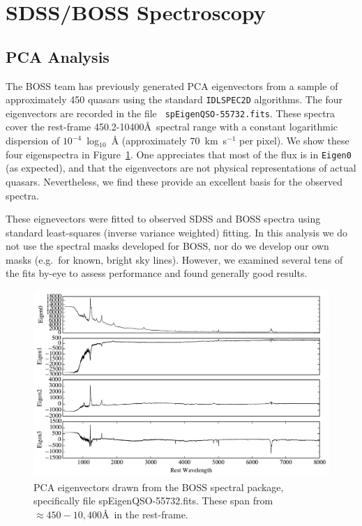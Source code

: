 \documentclass[11pt]{article}
\begin{document}
\section{SDSS/BOSS Spectroscopy}\label{sec:sdssboss}

\subsection{PCA Analysis}

The BOSS team has previously generated PCA eigenvectors from a sample
of approximately 450 quasars using the standard {\tt IDLSPEC2D}
algorithms.  The four eigenvectors are recorded in the file {\tt
  spEigenQSO-55732.fits}.  These spectra cover the rest-frame
450.2-10400\AA\ spectral range with a constant logarithmic dispersion
of $10^{-4}$~log$_{10}$~\AA{} (approximately $70$~km~s$^{-1}$ per
pixel).  We show these four eigenspectra in Figure~\ref{fig:eigen}.
One appreciates that most of the flux is in {\tt Eigen0} (as
expected), and that the eigenvectors are not physical representations
of actual quasars.  Nevertheless, we find these provide an excellent
basis for the observed spectra.

These eignevectors were fitted to observed SDSS and BOSS spectra using
standard least-squares (inverse variance weighted) fitting.  In this
analysis we do not use the spectral masks developed for BOSS, nor do
we develop our own masks (e.g.\ for known, bright sky lines).
However, we examined several tens of the fits by-eye to assess
performance and found generally good results.

\begin{figure}[h!]
  \vskip -0.1in
\begin{center}
  \includegraphics[width=5in]{figures/fig_boss_eigen.pdf}
\end{center}
 \vskip -0.20in
  \caption{\footnotesize 
    PCA eigenvectors drawn from the BOSS spectral package,
    specifically file spEigenQSO-55732.fits.  These span from $\approx
    450-10,400$\AA\ in the rest-frame.
 }\label{fig:eigen}
\vskip -0.1in
\end{figure}
\end{document}
